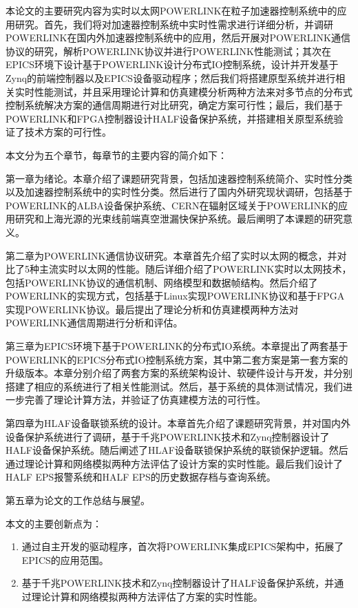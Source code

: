 本论文的主要研究内容为实时以太网POWERLINK在粒子加速器控制系统中的应用研究。首先，我们将对加速器控制系统中实时性需求进行详细分析，并调研POWERLINK在国内外加速器控制系统中的应用，然后开展对POWERLINK通信协议的研究，解析POWERLINK协议并进行POWERLINK性能测试；其次在EPICS环境下设计基于POWERLINK设计分布式IO控制系统，设计并开发基于Zynq的前端控制器以及EPICS设备驱动程序；然后我们将搭建原型系统并进行相关实时性能测试，并且采用理论计算和仿真建模分析两种方法来对多节点的分布式控制系统解决方案的通信周期进行对比研究，确定方案可行性；最后，我们基于POWERLINK和FPGA控制器设计HALF设备保护系统，并搭建相关原型系统验证了技术方案的可行性。

本文分为五个章节，每章节的主要内容的简介如下：

第一章为绪论。本章介绍了课题研究背景，包括加速器控制系统简介、实时性分类以及加速器控制系统中的实时性分类。然后进行了国内外研究现状调研，包括基于POWERLINK的ALBA设备保护系统、CERN在辐射区域关于POWERLINK的应用研究和上海光源的光束线前端真空泄漏快保护系统。最后阐明了本课题的研究意义。

第二章为POWERLINK通信协议研究。本章首先介绍了实时以太网的概念，并对比了5种主流实时以太网的性能。随后详细介绍了POWERLINK实时以太网技术，包括POWERLINK协议的通信机制、网络模型和数据帧结构。然后介绍了POWERLINK的实现方式，包括基于Linux实现POWERLINK协议和基于FPGA实现POWERLINK协议。最后提出了理论分析和仿真建模两种方法对POWERLINK通信周期进行分析和评估。

第三章为EPICS环境下基于POWERLINK的分布式IO系统。本章提出了两套基于POWERLINK的EPICS分布式IO控制系统方案，其中第二套方案是第一套方案的升级版本。本章分别介绍了两套方案的系统架构设计、软硬件设计与开发，并分别搭建了相应的系统进行了相关性能测试。然后，基于系统的具体测试情况，我们进一步完善了理论计算方法，并验证了仿真建模方法的可行性。

第四章为HLAF设备联锁系统的设计。本章首先介绍了课题研究背景，并对国内外设备保护系统进行了调研，基于千兆POWERLINK技术和Zynq控制器设计了HALF设备保护系统。随后阐述了HLAF设备联锁保护系统的联锁保护逻辑。然后通过理论计算和网络模拟两种方法评估了设计方案的实时性能。最后我们设计了HALF EPS报警系统和HALF EPS的历史数据存档与查询系统。

第五章为论文的工作总结与展望。


本文的主要创新点为：
\begin{enumerate}
	\item 通过自主开发的驱动程序，首次将POWERLINK集成EPICS架构中，拓展了EPICS的应用范围。
	\item 基于千兆POWERLINK技术和Zynq控制器设计了HALF设备保护系统，并通过理论计算和网络模拟两种方法评估了方案的实时性能。
\end{enumerate}

